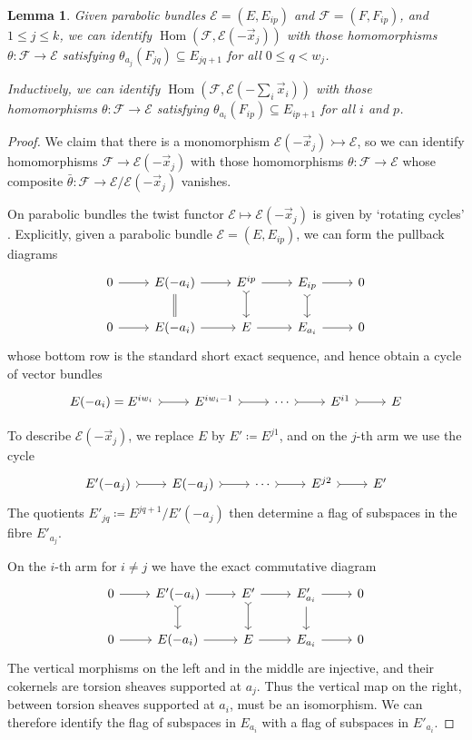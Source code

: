 \documentclass[12pt,a4paper]{amsart}
\theoremstyle{plain}
\newtheorem{lem}[thm]{Lemma}
\DeclareMathOperator{\Hom}{Hom}
\newcommand{\F}{\mathcal F}
\newcommand{\E}{\mathcal E}
\newcommand{\ox}{\vec x}
\begin{document}
\begin{lem}
\label{l:homtoshift}
Given parabolic bundles $\E = (E,E_{ip})$ and $\F = (F,F_{ip})$, and $1\leq j\leq k$, we can identify $\Hom(\F,\E(-\ox_j))$ with those homomorphisms $\theta\colon\F\to\E$ satisfying $\theta_{a_j}(F_{jq})\subseteq E_{jq+1}$ for all $0\leq q<w_j$.

Inductively, we can identify $\Hom(\F,\E(-\sum_i\ox_i))$ with those homomorphisms $\theta\colon\F\to\E$ satisfying $\theta_{a_i}(F_{ip})\subseteq E_{ip+1}$ for all $i$ and $p$.
\end{lem}

\begin{proof}
We claim that there is a monomorphism $\E(-\ox_j)\rightarrowtail\E$, so we can identify homomorphisms $\F\to\E(-\ox_j)$ with those homomorphisms $\theta\colon\F\to\E$ whose composite $\bar\theta\colon\F\to\E/\E(-\ox_j)$ vanishes.

On parabolic bundles the twist functor $\E\mapsto\E(-\ox_j)$ is given by `rotating cycles' \cite[\S4.1]{L}. Explicitly, given a parabolic bundle $\E=(E,E_{ip})$, we can form the pullback diagrams
\[ \begin{tikzcd}
0 \arrow[r] & E(-a_i) \arrow[r] \arrow[d,equal] & E^{ip} \arrow[r] \arrow[d,tail] & E_{ip} \arrow[r] \arrow[d,tail] & 0\\
0 \arrow[r] & E(-a_i) \arrow[r] & E \arrow[r] & E_{a_i} \arrow[r] & 0
\end{tikzcd} \]
whose bottom row is the standard short exact sequence, and hence obtain a cycle of vector bundles
\[ \begin{tikzcd}
E(-a_i)=E^{iw_i} \arrow[r,tail] & E^{iw_i-1} \arrow[r,tail] & \cdots \arrow[r,tail] &
E^{i1} \arrow[r,tail] & E
\end{tikzcd}\]

To describe $\E(-\ox_j)$, we replace $E$ by $E'\coloneqq E^{j1}$, and on the $j$-th arm we use the cycle
\[ \begin{tikzcd}
E'(-a_j) \arrow[r,tail] & E(-a_j) \arrow[r,tail] & \cdots \arrow[r,tail] & E^{j2} \arrow[r,tail] & E'
\end{tikzcd}\]
The quotients $E'_{jq}\coloneqq E^{jq+1}/E'(-a_j)$ then determine a flag of subspaces in the fibre $E'_{a_j}$.

On the $i$-th arm for $i\neq j$ we have the exact commutative diagram
\[ \begin{tikzcd}
0 \arrow[r] & E'(-a_i) \arrow[r] \arrow[d,tail] & E' \arrow[r] \arrow[d,tail] & E'_{a_i} \arrow[r] \arrow[d] & 0\\
0 \arrow[r] & E(-a_i) \arrow[r] & E \arrow[r] & E_{a_i} \arrow[r] & 0
\end{tikzcd}\]
The vertical morphisms on the left and in the middle are injective, and their cokernels are torsion sheaves supported at $a_j$. Thus the vertical map on the right, between torsion sheaves supported at $a_i$, must be an isomorphism. We can therefore identify the flag of subspaces in $E_{a_i}$ with a flag of subspaces in $E'_{a_i}$.


\end{proof}
\end{document}
